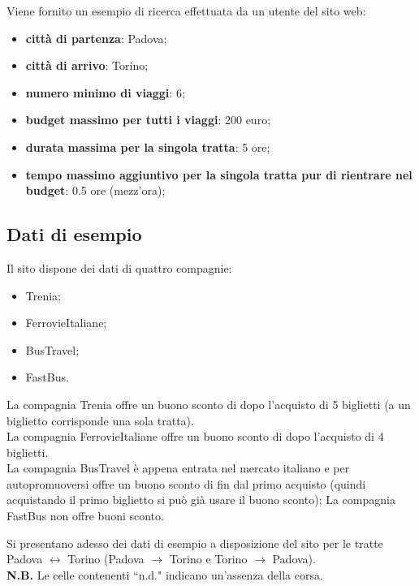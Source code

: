 \documentclass[main.tex]{subfiles}
\begin{document}
Viene fornito un esempio di ricerca effettuata da un utente del sito web:
\begin{itemize}
    \item \textbf{città di partenza}: Padova;
    \item \textbf{città di arrivo}: Torino;
    \item \textbf{numero minimo di viaggi}: 6;
    \item \textbf{budget massimo per tutti i viaggi}: 200 euro;
    \item \textbf{durata massima per la singola tratta}: 5 ore;
    \item \textbf{tempo massimo aggiuntivo per la singola tratta pur di rientrare nel budget}: 0.5 ore (mezz'ora);
\end{itemize}

\clearpage

\subsection{Dati di esempio}
Il sito dispone dei dati di quattro compagnie:
\begin{itemize}
    \item Trenia;
    \item FerrovieItaliane;
    \item BusTravel;
    \item FastBus.
\end{itemize}
La compagnia Trenia offre un buono sconto di  dopo l'acquisto di 5 biglietti (a un biglietto corrisponde una sola tratta).\\
La compagnia FerrovieItaliane offre un buono sconto di  dopo l'acquisto di 4 biglietti.\\
La compagnia BusTravel è appena entrata nel mercato italiano e per autopromuoversi offre un buono sconto di  fin dal primo acquisto (quindi acquistando il primo biglietto si può già usare il buono sconto);
La compagnia FastBus non offre buoni sconto.

Si presentano adesso dei dati di esempio a disposizione del sito per le tratte Padova $\leftrightarrow$ Torino (Padova $\rightarrow$ Torino e Torino $\rightarrow$ Padova).\\
\textbf{N.B.} Le celle contenenti ``n.d." indicano un'assenza della corsa.
\end{document}
